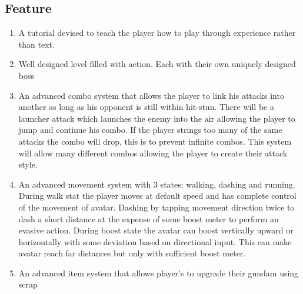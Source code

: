\documentclass{article}
\begin{document}
\subsection*{Feature}
    \begin{enumerate}
        \item A tutorial devised to teach the player how to play through experience rather than text.
        \item Well designed level filled with action. Each with their own uniquely designed boss
        \item An advanced combo system that allows the player to link his attacks into another as long as his opponent is still within hit-stun. There will be a launcher attack which launches the enemy into the air allowing the player to jump and continue his combo. If the player strings too many of the same attacks the combo will drop, this is to prevent infinite combos. This system will allow many different combos allowing the player to create their attack style.
        \item An advanced movement system with 3 states: walking, dashing and running. During walk stat the player moves at default speed and has complete control of the movement of avatar. Dashing by tapping movement direction twice to dash a short distance at the expense of some boost meter to perform an evasive action. During boost state the avatar can boost vertically upward or horizontally with some deviation based on directional input. This can make avatar reach far distances but only with sufficient boost meter.
        \item An advanced item system that allows player's to upgrade their gundam using scrap 
    \end{enumerate}
    
\end{document}
